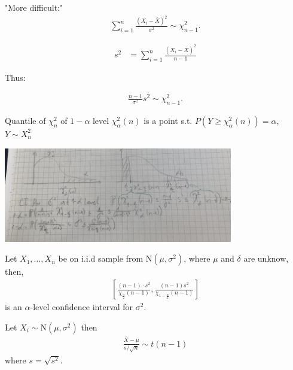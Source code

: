 \documentclass[10pt]{article}
\begin{document}
"More difficult:"
\begin{align*}
\sum_{ i = 1 }^{ n } \frac{(X_i -  \overline{X}) ^2 }{\sigma ^2 } \sim \chi  _{n - 1} ^2 .
\end{align*}


\begin{definition}  \label{def:Sample_Variance}
\begin{align*}
s ^2  &  = \sum_{ i = 1 }^{ n } \frac{(X_i - \overline{X})^2 }{n - 1}
\end{align*}
\end{definition}

Thus:

\begin{theorem}[] \label{thm:}
\begin{align*}
\frac{n - 1}{\sigma ^2 } s^2  \sim \chi  _{n - 1} ^2 .
\end{align*}
\end{theorem}

Quantile of \(\chi  _{n} ^2\) of \(1 - \alpha\) level \(\chi ^2  _{\alpha } (n)\) is a point s.t.
\(P(Y \geq \chi  _{\alpha } ^2 (n)) = \alpha\), \(Y \sim X _{n} ^2\)

\begin{center}
\includegraphics[angle=0,width=10cm]{./img/chi.png}
\end{center}


\begin{theorem}[] \label{thm:}
Let \(X_1, \dots , X_n\) be on i.i.d sample from \(\text{N}(\mu , \sigma^2)\), where
\(\mu\) and \(\delta\) are unknow, then,
\begin{align*}
\left[ \frac{(n - 1) \cdot s^2 }{\chi  _{\frac{\alpha}{2}}(n - 1) }, \frac{(n - 1) s ^2 }{\chi  _{1 - \frac{\alpha}{2}} (n - 1)} \right] 
\end{align*}
is an \(\alpha\)-level confidence interval for \(\sigma ^2\).
\end{theorem}

Let \(X_i \sim \text{N}(\mu , \sigma^2)\) then
\begin{align*}
\frac{\overline{X} - \mu }{s / \sqrt{n}} \sim t(n - 1)
\end{align*}
where \(s = \sqrt{s^2 }\).
\end{document}
